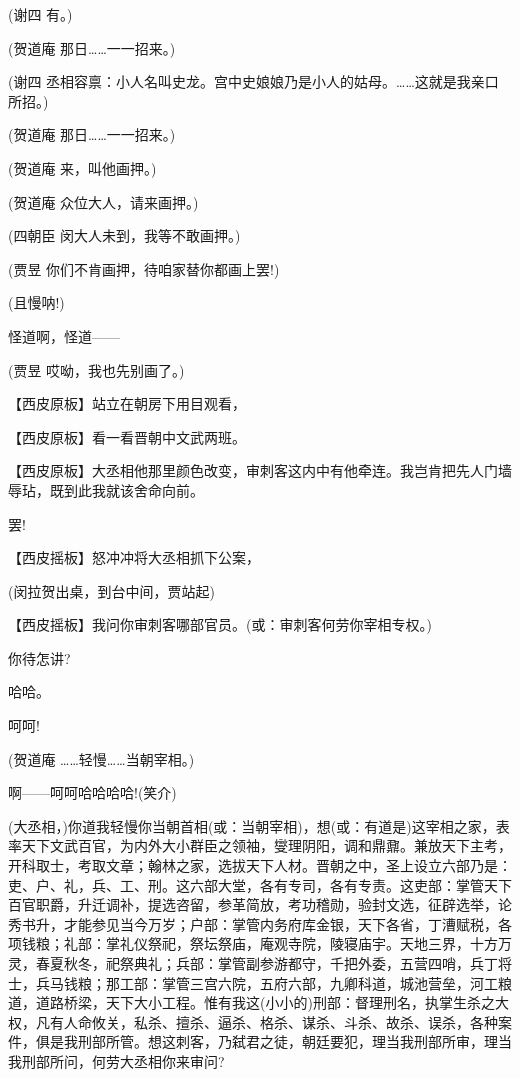 (谢四 有。)

(贺道庵 那日\ldots{}\ldots{}一一招来。)

(谢四
丞相容禀：小人名叫史龙。宫中史娘娘乃是小人的姑母。\ldots{}\ldots{}这就是我亲口所招。)

(贺道庵 那日\ldots{}\ldots{}一一招来。)

(贺道庵 来，叫他画押。)

(贺道庵 众位大人，请来画押。)

(四朝臣 闵大人未到，我等不敢画押。)

(贾昱 你们不肯画押，待咱家替你都画上罢!)

(且慢呐!)

怪道啊，怪道------

(贾昱 哎呦，我也先别画了。)

【西皮原板】站立在朝房下用目观看，

【西皮原板】看一看晋朝中文武两班。

【西皮原板】大丞相他那里颜色改变，审刺客这内中有他牵连。我岂肯把先人门墙辱玷，既到此我就该舍命向前。

罢!

【西皮摇板】怒冲冲将大丞相抓下公案，

(闵拉贺出桌，到台中间，贾站起)

【西皮摇板】我问你审刺客哪部官员。(或：审刺客何劳你宰相专权。)

你待怎讲?

哈哈。

呵呵!

(贺道庵 \ldots{}\ldots{}轻慢\ldots{}\ldots{}当朝宰相。)

啊------呵呵哈哈哈哈!(笑介)

(大丞相，)你道我轻慢你当朝首相(或：当朝宰相)，想(或：有道是)这宰相之家，表率天下文武百官，为内外大小群臣之领袖，燮理阴阳，调和鼎鼐。兼放天下主考，开科取士，考取文章；翰林之家，选拔天下人材。晋朝之中，圣上设立六部乃是：吏、户、礼，兵、工、刑。这六部大堂，各有专司，各有专责。这吏部：掌管天下百官职爵，升迁调补，提选咨留，参革简放，考功稽勋，验封文选，征辟选举，论秀书升，才能参见当今万岁；户部：掌管内务府库金银，天下各省，丁漕赋税，各项钱粮；礼部：掌礼仪祭祀，祭坛祭庙，庵观寺院，陵寝庙宇。天地三界，十方万灵，春夏秋冬，祀祭典礼；兵部：掌管副参游都守，千把外委，五营四哨，兵丁将士，兵马钱粮；那工部：掌管三宫六院，五府六部，九卿科道，城池营垒，河工粮道，道路桥梁，天下大小工程。惟有我这(小小的)刑部：督理刑名，执掌生杀之大权，凡有人命攸关，私杀、擅杀、逼杀、格杀、谋杀、斗杀、故杀、误杀，各种案件，俱是我刑部所管。想这刺客，乃弑君之徒，朝廷要犯，理当我刑部所审，理当我刑部所问，何劳大丞相你来审问?


